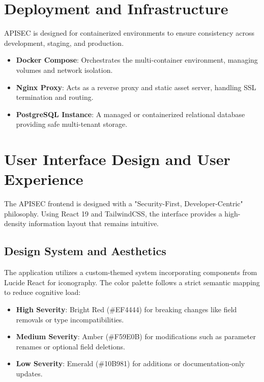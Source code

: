 \documentclass{fisatprojectfinal}
\begin{document}
\section{Deployment and Infrastructure}
APISEC is designed for containerized environments to ensure consistency across development, staging, and production.

\begin{itemize}
    \item \textbf{Docker Compose}: Orchestrates the multi-container environment, managing volumes and network isolation.
    \item \textbf{Nginx Proxy}: Acts as a reverse proxy and static asset server, handling SSL termination and routing.
    \item \textbf{PostgreSQL Instance}: A managed or containerized relational database providing safe multi-tenant storage.
\end{itemize}

\section{User Interface Design and User Experience}
The APISEC frontend is designed with a "Security-First, Developer-Centric" philosophy. Using React 19 and TailwindCSS, the interface provides a high-density information layout that remains intuitive.

\subsection{Design System and Aesthetics}
The application utilizes a custom-themed system incorporating components from Lucide React for iconography. The color palette follows a strict semantic mapping to reduce cognitive load:
\begin{itemize}
    \item \textbf{High Severity}: Bright Red (\#EF4444) for breaking changes like field removals or type incompatibilities.
    \item \textbf{Medium Severity}: Amber (\#F59E0B) for modifications such as parameter renames or optional field deletions.
    \item \textbf{Low Severity}: Emerald (\#10B981) for additions or documentation-only updates.
\end{itemize}
\end{document}
